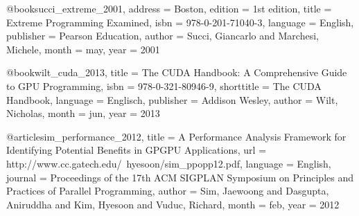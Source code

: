 {@book{succi_extreme_2001,
  address   = {Boston},
  edition   = {1st edition},
  title     = {Extreme {Programming} {Examined}},
  isbn      = {978-0-201-71040-3},
  language  = {English},
  publisher = {Pearson Education},
  author    = {Succi, Giancarlo and Marchesi, Michele},
  month     = may,
  year      = {2001}
}

@book{wilt_cuda_2013,
  title      = {The {CUDA} {Handbook}: {A} {Comprehensive} {Guide} to {GPU} {Programming}},
  isbn       = {978-0-321-80946-9},
  shorttitle = {The {CUDA} {Handbook}},
  language   = {Englisch},
  publisher  = {Addison Wesley},
  author     = {Wilt, Nicholas},
  month      = jun,
  year       = {2013}
}

@article{sim_performance_2012,
  title    = {A {Performance} {Analysis} {Framework} for {Identifying} {Potential} {Benefits} in {GPGPU} {Applications}},
  url      = {http://www.cc.gatech.edu/~hyesoon/sim_ppopp12.pdf},
  language = {English},
  journal  = {Proceedings of the 17th ACM SIGPLAN Symposium on Principles and Practices of Parallel Programming},
  author   = {Sim, Jaewoong and Dasgupta, Aniruddha and Kim, Hyesoon and Vuduc, Richard},
  month    = feb,
  year     = {2012}
}

}
